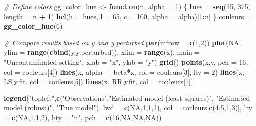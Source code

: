 \documentclass[]{book}
\newenvironment{Shaded}{\begin{snugshade}}{\end{snugshade}}
\newcommand{\KeywordTok}[1]{\textcolor[rgb]{0.13,0.29,0.53}{\textbf{#1}}}
\newcommand{\DataTypeTok}[1]{\textcolor[rgb]{0.13,0.29,0.53}{#1}}
\newcommand{\DecValTok}[1]{\textcolor[rgb]{0.00,0.00,0.81}{#1}}
\newcommand{\StringTok}[1]{\textcolor[rgb]{0.31,0.60,0.02}{#1}}
\newcommand{\CommentTok}[1]{\textcolor[rgb]{0.56,0.35,0.01}{\textit{#1}}}
\newcommand{\OtherTok}[1]{\textcolor[rgb]{0.56,0.35,0.01}{#1}}
\newcommand{\ControlFlowTok}[1]{\textcolor[rgb]{0.13,0.29,0.53}{\textbf{#1}}}
\newcommand{\OperatorTok}[1]{\textcolor[rgb]{0.81,0.36,0.00}{\textbf{#1}}}
\newcommand{\NormalTok}[1]{#1}
\theoremstyle{definition}
\theoremstyle{definition}
\theoremstyle{definition}
\theoremstyle{remark}
\begin{document}
\begin{Shaded}
\begin{Highlighting}[]
\CommentTok{# Define colors}
\NormalTok{gg_color_hue <-}\StringTok{ }\ControlFlowTok{function}\NormalTok{(n, }\DataTypeTok{alpha =} \DecValTok{1}\NormalTok{) \{}
\NormalTok{  hues =}\StringTok{ }\KeywordTok{seq}\NormalTok{(}\DecValTok{15}\NormalTok{, }\DecValTok{375}\NormalTok{, }\DataTypeTok{length =}\NormalTok{ n }\OperatorTok{+}\StringTok{ }\DecValTok{1}\NormalTok{)}
  \KeywordTok{hcl}\NormalTok{(}\DataTypeTok{h =}\NormalTok{ hues, }\DataTypeTok{l =} \DecValTok{65}\NormalTok{, }\DataTypeTok{c =} \DecValTok{100}\NormalTok{, }\DataTypeTok{alpha =}\NormalTok{ alpha)[}\DecValTok{1}\OperatorTok{:}\NormalTok{n]}
\NormalTok{\}}
\NormalTok{couleurs =}\StringTok{ }\KeywordTok{gg_color_hue}\NormalTok{(}\DecValTok{6}\NormalTok{)}

\CommentTok{# Compare results based on y and y.perturbed}
\KeywordTok{par}\NormalTok{(}\DataTypeTok{mfrow =} \KeywordTok{c}\NormalTok{(}\DecValTok{1}\NormalTok{,}\DecValTok{2}\NormalTok{))}
\KeywordTok{plot}\NormalTok{(}\OtherTok{NA}\NormalTok{, }\DataTypeTok{ylim =} \KeywordTok{range}\NormalTok{(}\KeywordTok{cbind}\NormalTok{(y,y.perturbed)), }\DataTypeTok{xlim =} \KeywordTok{range}\NormalTok{(x),}
     \DataTypeTok{main =} \StringTok{"Uncontaminated setting"}\NormalTok{, }\DataTypeTok{xlab =} \StringTok{"x"}\NormalTok{, }\DataTypeTok{ylab =} \StringTok{"y"}\NormalTok{)}
\KeywordTok{grid}\NormalTok{()}
\KeywordTok{points}\NormalTok{(x,y, }\DataTypeTok{pch =} \DecValTok{16}\NormalTok{, }\DataTypeTok{col =}\NormalTok{ couleurs[}\DecValTok{4}\NormalTok{])}
\KeywordTok{lines}\NormalTok{(x, alpha }\OperatorTok{+}\StringTok{ }\NormalTok{beta}\OperatorTok{*}\NormalTok{x, }\DataTypeTok{col =}\NormalTok{ couleurs[}\DecValTok{3}\NormalTok{], }\DataTypeTok{lty =} \DecValTok{2}\NormalTok{)}
\KeywordTok{lines}\NormalTok{(x, LS.y.fit, }\DataTypeTok{col =}\NormalTok{ couleurs[}\DecValTok{5}\NormalTok{])}
\KeywordTok{lines}\NormalTok{(x, RR.y.fit, }\DataTypeTok{col =}\NormalTok{ couleurs[}\DecValTok{1}\NormalTok{])}

\KeywordTok{legend}\NormalTok{(}\StringTok{"topleft"}\NormalTok{,}\KeywordTok{c}\NormalTok{(}\StringTok{"Observations"}\NormalTok{,}\StringTok{"Estimated model (least-squares)"}\NormalTok{,}
                   \StringTok{"Estimated model (robust)"}\NormalTok{, }\StringTok{"True model"}\NormalTok{), }
       \DataTypeTok{lwd =} \KeywordTok{c}\NormalTok{(}\OtherTok{NA}\NormalTok{,}\DecValTok{1}\NormalTok{,}\DecValTok{1}\NormalTok{,}\DecValTok{1}\NormalTok{), }\DataTypeTok{col =}\NormalTok{ couleurs[}\KeywordTok{c}\NormalTok{(}\DecValTok{4}\NormalTok{,}\DecValTok{5}\NormalTok{,}\DecValTok{1}\NormalTok{,}\DecValTok{3}\NormalTok{)],}
       \DataTypeTok{lty =} \KeywordTok{c}\NormalTok{(}\OtherTok{NA}\NormalTok{,}\DecValTok{1}\NormalTok{,}\DecValTok{1}\NormalTok{,}\DecValTok{2}\NormalTok{), }\DataTypeTok{bty =} \StringTok{"n"}\NormalTok{, }\DataTypeTok{pch =} \KeywordTok{c}\NormalTok{(}\DecValTok{16}\NormalTok{,}\OtherTok{NA}\NormalTok{,}\OtherTok{NA}\NormalTok{,}\OtherTok{NA}\NormalTok{))}


\end{Highlighting}
\end{Shaded}
\end{document}
